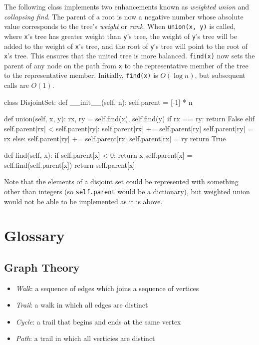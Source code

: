 \documentclass[12pt, titlepage]{article}
\begin{document}
The following class implements two enhancements known as \textit{weighted union} and \textit{collapsing find}. The parent of a root is now a negative number whose absolute value corresponds to the tree's \textit{weight} or \textit{rank}. When \texttt{union(x, y)} is called, where \texttt{x}'s tree has greater weight than \texttt{y}'s tree, the weight of \texttt{y}'s tree will be added to the weight of \texttt{x}'s tree, and the root of \texttt{y}'s tree will point to the root of \texttt{x}'s tree. This ensures that the united tree is more balanced. \texttt{find(x)} now sets the parent of any node on the path from \texttt{x} to the representative member of the tree to the representative member. Initially, \texttt{find(x)} is $O(\log n)$, but subsequent calls are $O(1)$.
\medskip
\begin{python}
class DisjointSet:
    def __init__(self, n):
        self.parent = [-1] * n

    def union(self, x, y):
        rx, ry = self.find(x), self.find(y)
        if rx == ry:
            return False
        elif self.parent[rx] < self.parent[ry]:
            self.parent[rx] += self.parent[ry]
            self.parent[ry] = rx
        else:
            self.parent[ry] += self.parent[rx]
            self.parent[rx] = ry
        return True

    def find(self, x):
        if self.parent[x] < 0:
            return x
        self.parent[x] = self.find(self.parent[x])
        return self.parent[x]
\end{python}
\bigskip

Note that the elements of a disjoint set could be represented with something other than integers (so \texttt{self.parent} would be a dictionary), but weighted union would not be able to be implemented as it is above.

\section{Glossary}

\subsection{Graph Theory}
\begin{itemize}
  \item \textit{Walk}: a sequence of edges which joins a sequence of vertices
  \item \textit{Trail}: a walk in which all edges are distinct
  \item \textit{Cycle}: a trail that begins and ends at the same vertex
  \item \textit{Path}: a trail in which all verticies are distinct
\end{itemize}
\end{document}
